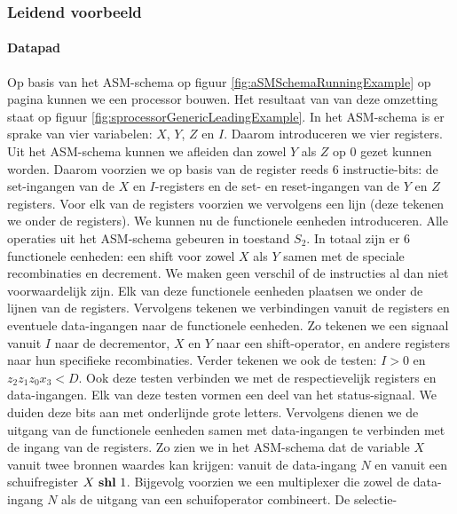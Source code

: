 \subsubsection{Leidend voorbeeld}
\paragraph{Datapad}
Op basis van het ASM-schema op figuur \ref{fig:aSMSchemaRunningExample} op pagina \pageref{fig:aSMSchemaRunningExample} kunnen we een processor bouwen. Het resultaat van van deze omzetting staat op figuur \ref{fig:sprocessorGenericLeadingExample}. In het ASM-schema is er sprake van vier variabelen: $X$, $Y$, $Z$ en $I$. Daarom introduceren we vier registers. Uit het ASM-schema kunnen we afleiden dan zowel $Y$ als $Z$ op 0 gezet kunnen worden. Daarom voorzien we op basis van de register reeds 6 instructie-bits: de set-ingangen van de $X$ en $I$-registers en de set- en reset-ingangen van de $Y$ en $Z$ registers. Voor elk van de registers voorzien we vervolgens een lijn (deze tekenen we onder de registers). We kunnen nu de functionele eenheden introduceren. Alle operaties uit het ASM-schema gebeuren in toestand $S_2$. In totaal zijn er 6 functionele eenheden: een shift voor zowel $X$ als $Y$ samen met de speciale recombinaties en decrement. We maken geen verschil of de instructies al dan niet voorwaardelijk
zijn. Elk van deze functionele eenheden plaatsen we onder de lijnen van de registers. Vervolgens tekenen we verbindingen vanuit de registers en eventuele data-ingangen naar de functionele eenheden. Zo tekenen we een signaal vanuit $I$ naar de decrementor, $X$ en $Y$ naar een shift-operator, en andere registers naar hun specifieke recombinaties. Verder tekenen we ook de testen: $I>0$ en $z_2z_1z_0x_3<D$. Ook deze testen verbinden we met de respectievelijk registers en data-ingangen. Elk van deze testen vormen een deel van het status-signaal. We duiden deze bits aan met onderlijnde grote letters. Vervolgens dienen we de uitgang van de functionele eenheden samen met data-ingangen te verbinden met de ingang van de registers. Zo zien we in het ASM-schema dat de variable $X$ vanuit twee bronnen waardes kan krijgen: vanuit de data-ingang $N$ en vanuit een schuifregister $X\mbox{ \textbf{shl} }1$. Bijgevolg voorzien we een multiplexer die zowel de data-ingang $N$ als de uitgang van een schuifoperator combineert. De selectie-
